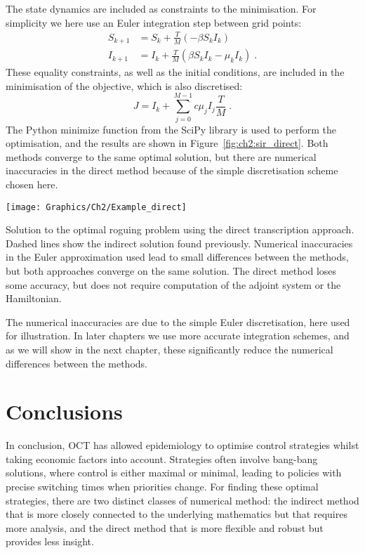 \begin{example}
    The state dynamics are included as constraints to the minimisation. For simplicity we here use an Euler integration step between grid points:
    \begin{subequations}
        \begin{align}
            S_{k+1} &= S_k + \frac{T}{M} \left(-\beta{}S_kI_k\right)\\
            I_{k+1} &= I_k + \frac{T}{M} \left(\beta{}S_kI_k - \mu_kI_k\right)\;.
        \end{align}
    \end{subequations}
    These equality constraints, as well as the initial conditions, are included in the minimisation of the objective, which is also discretised:
    \begin{equation}
        J = I_k + \sum_{j=0}^{M-1}c\mu_jI_j\frac{T}{M}\;.
    \end{equation}
    The Python minimize function from the SciPy library \citep{scipy} is used to perform the optimisation, and the results are shown in Figure~\ref{fig:ch2:sir_direct}. Both methods converge to the same optimal solution, but there are numerical inaccuracies in the direct method because of the simple discretisation scheme chosen here.

    {
        \vspace*{1cm}
        \captionsetup{type=figure}
        \centering \texttt{[image: Graphics/Ch2/Example\_direct]}
        \caption[Optimal roguing strategy using the direct approach]{Solution to the optimal roguing problem using the direct transcription approach. Dashed lines show the indirect solution found previously. Numerical inaccuracies in the Euler approximation used lead to small differences between the methods, but both approaches converge on the same solution. The direct method loses some accuracy, but does not require computation of the adjoint system or the Hamiltonian.\label{fig:ch2:sir_direct}}
    }

    The numerical inaccuracies are due to the simple Euler discretisation, here used for illustration. In later chapters we use more accurate integration schemes, and as we will show in the next chapter, these significantly reduce the numerical differences between the methods.

\end{example}

\section{Conclusions}

In conclusion, OCT has allowed epidemiology to optimise control strategies whilst taking economic factors into account. Strategies often involve bang-bang solutions, where control is either maximal or minimal, leading to policies with precise switching times when priorities change. For finding these optimal strategies, there are two distinct classes of numerical method: the indirect method that is more closely connected to the underlying mathematics but that requires more analysis, and the direct method that is more flexible and robust but provides less insight.
